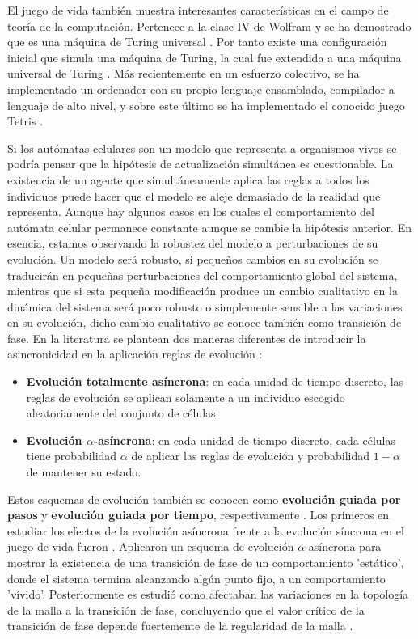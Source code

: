 \documentclass[../proyecto.tex]{book}
\begin{document}
El juego de vida también muestra interesantes características en el campo de teoría de la computación. Pertenece a la clase IV de Wolfram \cite{ccuatro, ccuatro2} y se ha demostrado que es una máquina de Turing universal \cite{turingUniversal}. Por tanto existe una configuración inicial que simula una máquina de Turing, la cual fue extendida a una máquina universal de Turing \cite{turing}. Más recientemente en un esfuerzo colectivo, se ha implementado un ordenador con su propio lenguaje ensamblado, compilador a lenguaje de alto nivel, y sobre este último se ha implementado el conocido juego Tetris \cite{tetris, logical}.

Si los autómatas celulares son un modelo que representa a organismos vivos se podría pensar que la hipótesis de actualización simultánea es cuestionable. La existencia de un agente que simultáneamente aplica las reglas a todos los individuos puede hacer que el modelo se aleje demasiado de la realidad que representa. Aunque hay algunos casos en los cuales el comportamiento del autómata celular permanece constante aunque se cambie la hipótesis anterior. En esencia, estamos observando la robustez del modelo a perturbaciones de su evolución. Un modelo será robusto, si pequeños cambios en su evolución se traducirán en pequeñas perturbaciones del comportamiento global del sistema, mientras que si esta pequeña modificación produce un cambio cualitativo en la dinámica del sistema será poco robusto o simplemente sensible a las variaciones en su evolución, dicho cambio cualitativo se conoce también como transición de fase. En la literatura se plantean dos maneras diferentes de introducir la asincronicidad en la aplicación reglas de evolución \cite{asyncIntro}:
\begin{itemize}
	\item \textbf{Evolución totalmente asíncrona}: en cada unidad de tiempo discreto, las reglas de evolución se aplican solamente a un individuo escogido aleatoriamente del conjunto de células.
	\item \textbf{Evolución $\alpha$-asíncrona}: en cada unidad de tiempo discreto, cada células tiene probabilidad $\alpha$ de aplicar las reglas de evolución y probabilidad $1-\alpha$ de mantener su estado.
\end{itemize}

Estos esquemas de evolución también se conocen como \textbf{evolución guiada por pasos} y \textbf{evolución guiada por tiempo}, respectivamente \cite{aka}. Los primeros en estudiar los efectos de la evolución asíncrona frente a la evolución síncrona en el juego de vida fueron \cite{syncVSasync}. Aplicaron un esquema de evolución $\alpha$-asíncrona para mostrar la existencia de una transición de fase de un comportamiento 'estático', donde el sistema termina alcanzando algún punto fijo, a un comportamiento 'vívido'. Posteriormente es estudió como afectaban las variaciones en la topología de la malla a la transición de fase, concluyendo que el valor crítico de la transición de fase depende fuertemente de la regularidad de la malla \cite{mallaIrregular1, mallaIrregular2}.
\end{document}
